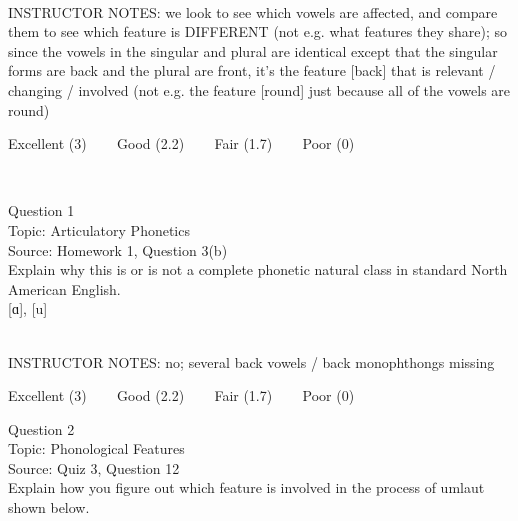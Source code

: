 \documentclass[12pt]{article}
\begin{document}
~\\
INSTRUCTOR NOTES: we look to see which vowels are affected, and compare them to see which feature is DIFFERENT (not e.g. what features they share); so since the vowels in the singular and plural are identical except that the singular forms are back and the plural are front, it's the feature [back] that is relevant / changing / involved (not e.g. the feature [round] just because all of the vowels are round)


\vfill
Excellent (3) ~~~ Good (2.2) ~~~ Fair (1.7) ~~~ Poor (0)
\newpage

\begin{center}
\textbf{{\color{red}{\HUGE END OF EXAM}}}\\

\end{center}
\newpage

\begin{center}
\textbf{{\color{blue}{\HUGE START OF EXAM\\}}}

\textbf{{\color{blue}{\HUGE Student ID: 74145\\}}}

\textbf{{\color{blue}{\HUGE 4:50\\}}}

\end{center}
\newpage

{\large Question 1}\\

Topic: Articulatory Phonetics\\
Source: Homework 1, Question 3(b)\\

Explain why this is or is not a complete phonetic natural class in standard North American English.\\

{[ɑ]}, {[u]}


~\\
INSTRUCTOR NOTES: no; several back vowels / back monophthongs missing


\vfill
Excellent (3) ~~~ Good (2.2) ~~~ Fair (1.7) ~~~ Poor (0)
\newpage

{\large Question 2}\\

Topic: Phonological Features\\
Source: Quiz 3, Question 12\\

Explain how you figure out which feature is involved in the process of umlaut shown below.\\
\end{document}
